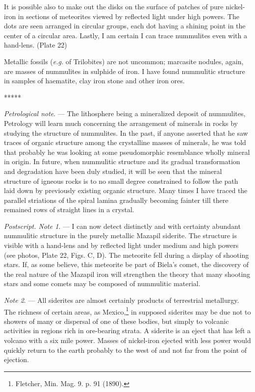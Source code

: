 \documentclass[a4paper, 12pt, oneside]{article}
\begin{document}
It is possible also to make out the disks on the surface of patches of pure nickel-iron in sections of meteorites viewed by reflected light under high powers. The dots are seen arranged in circular groups, each dot having a shining point in the center of a circular area. Lastly, I am certain I can trace nummulites even with a hand-lens. (Plate 22)

Metallic fossils (\emph{e.g.} of Trilobites) are not uncommon; marcasite nodules, again, are masses of nummulites in sulphide of iron. I have found nummulitic structure in samples of haematite, clay iron stone and other iron ores.

\centerline{*\hspace{15mm}*\hspace{15mm}*\hspace{15mm}*\hspace{15mm}*}
\bigskip

\emph{Petrological note}. --- The lithosphere being a mineralized deposit of nummulites, Petrology will learn much concerning the arrangement of minerals in rocks by studying the structure of nummulites. In the past, if anyone asserted that he saw traces of organic structure among the crystalline masses of minerals, he was told that probably he was looking at some pseudomorphic resemblance wholly mineral in origin. In future, when nummulitic structure and its gradual transformation and degradation have been duly studied, it will be seen that the mineral structure of igneous rocks is to no small degree constrained to follow the path laid down by previously existing organic structure. Many times I have traced the parallel striations of the spiral lamina gradually becoming fainter till there remained rows of straight lines in a crystal.

\emph{Postscript. Note 1}. --- I can now detect distinctly and with certainty abundant nummulitic structure in the purely metallic Mazapil siderite. The structure is visible with a hand-lens and by reflected light under medium and high powers (see photos, Plate 22, Figs. C, D). The meteorite fell during a display of shooting stars. If, as some believe, this meteorite be part of Biela's comet, the discovery of the real nature of the Mazapil iron will strengthen the theory that many shooting stars and some comets may be composed of nummulitic material.

\emph{Note 2}. --- All siderites are almost certainly products of terrestrial metallurgy. The richness of certain areas, as Mexico,\footnote{Fletcher, Min. Mag. 9. p. 91 (1890).} in supposed siderites may be due not to showers of many or dispersal of one of these bodies, but simply to volcanic activities in regions rich in ore-bearing strata. A siderite is an eject that has left a volcano with a six mile power. Masses of nickel-iron ejected with less power would quickly return to the earth probably to the west of and not far from the point of ejection.
\end{document}
